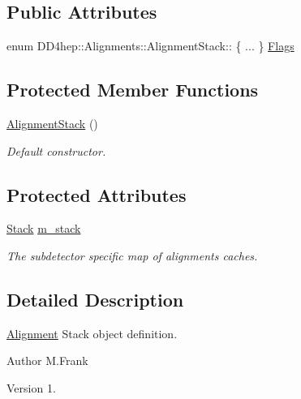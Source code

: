 \subsection*{Public Attributes}
\begin{DoxyCompactItemize}
\item 
enum D\+D4hep\+::\+Alignments\+::\+Alignment\+Stack\+:: \{ ... \}  \hyperlink{class_d_d4hep_1_1_alignments_1_1_alignment_stack_acf79d8d4af7ef5666d1096280c8da3e8}{Flags}
\end{DoxyCompactItemize}
\subsection*{Protected Member Functions}
\begin{DoxyCompactItemize}
\item 
\hyperlink{class_d_d4hep_1_1_alignments_1_1_alignment_stack_acc1d9b3831a66d74c6ef2adde3bc97c6}{Alignment\+Stack} ()
\begin{DoxyCompactList}\small\item\em Default constructor. \end{DoxyCompactList}\end{DoxyCompactItemize}
\subsection*{Protected Attributes}
\begin{DoxyCompactItemize}
\item 
\hyperlink{class_d_d4hep_1_1_alignments_1_1_alignment_stack_a14076338e30231119d5d291b5ac316ee}{Stack} \hyperlink{class_d_d4hep_1_1_alignments_1_1_alignment_stack_ae6d6fe967fc507fc1275e15f5cbff876}{m\+\_\+stack}
\begin{DoxyCompactList}\small\item\em The subdetector specific map of alignments caches. \end{DoxyCompactList}\end{DoxyCompactItemize}


\subsection{Detailed Description}
\hyperlink{class_d_d4hep_1_1_alignments_1_1_alignment}{Alignment} Stack object definition. 

\begin{DoxyAuthor}{Author}
M.\+Frank 
\end{DoxyAuthor}
\begin{DoxyVersion}{Version}
1. 
\end{DoxyVersion}



